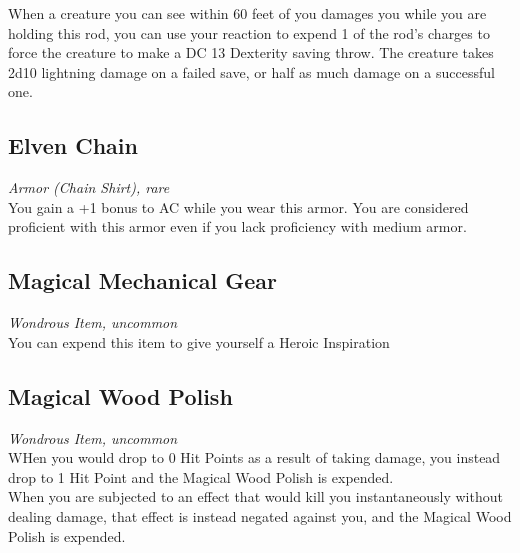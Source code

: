 \documentclass[letterpaper,openany,oneside,twocolumn]{book}
\begin{document}
When a creature you can see within 60 feet of you damages you while you are holding this rod, you can use your reaction to expend 1 of the rod's charges to force the creature to make a DC 13 Dexterity saving throw. The creature takes 2d10 lightning damage on a failed save, or half as much damage on a successful one.

\subsection*{Elven Chain}
\textit{Armor (Chain Shirt), rare}\\
You gain a +1 bonus to AC while you wear this armor. You are considered proficient with this armor even if you lack proficiency with medium armor.

\subsection*{Magical Mechanical Gear}
\textit{Wondrous Item, uncommon}\\
You can expend this item to give yourself a Heroic Inspiration

\subsection*{Magical Wood Polish}
\textit{Wondrous Item, uncommon}\\
WHen you would drop to 0 Hit Points as a result of taking damage, you instead drop to 1 Hit Point and the Magical Wood Polish is expended.\\
When you are subjected to an effect that would kill you instantaneously without dealing damage, that effect is instead negated against you, and the Magical Wood Polish is expended.
\end{document}
